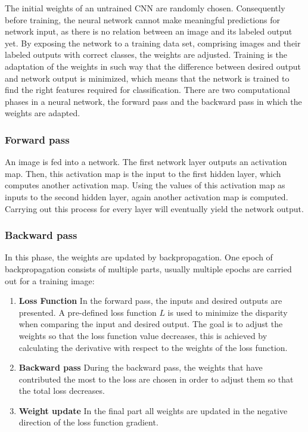     The initial weights of an untrained CNN are randomly chosen. Consequently before training, the neural network cannot make meaningful predictions for network input, as there is no relation between an image and its labeled output yet. By exposing the network to a training data set, comprising images and their labeled outputs with correct classes, the weights are adjusted. Training is the adaptation of the weights in such way that the difference between desired output and network output is minimized, which means that the network is trained to find the right features required for classification. There are two computational phases in a neural network, the forward pass and the backward pass in which the weights are adapted.

    \subsubsection{Forward pass}
    An image is fed into a network. The first network layer outputs an activation map. Then, this activation map is the input to the first hidden layer, which computes another activation map. Using the values of this activation map as inputs to the second hidden layer, again another activation map is computed. Carrying out this process for every layer will eventually yield the network output.

    \subsubsection{Backward pass}
    In this phase, the weights are updated by backpropagation. One epoch of backpropagation consists of multiple parts, usually multiple epochs are carried out for a training image:
    \begin{enumerate}
        \item \textbf{Loss Function} In the forward pass, the inputs and desired outputs are presented. A pre-defined loss function $L$ is used to minimize the disparity when comparing the input and desired output. The goal is to adjust the weights so that the loss function value decreases, this is achieved by calculating the derivative with respect to the weights of the loss function.
        \item \textbf{Backward pass} During the backward pass, the weights that have contributed the most to the loss are chosen in order to adjust them so that the total loss decreases.
        \item \textbf{Weight update} In the final part all weights are updated in the negative direction of the loss function gradient.
    \end{enumerate}
    
